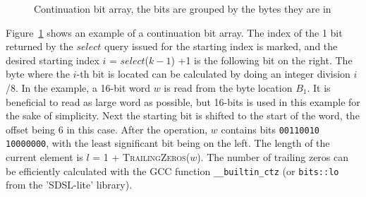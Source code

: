 \begin{figure}[ht]
\centering
{}
\caption{Continuation bit array, the bits are grouped by the bytes they are in} \label{subarray}
\end{figure}

Figure~\ref{subarray} shows an example of a continuation bit array. The index of the 1 bit returned by the $select$ query issued for the starting index is marked, and the desired starting index 
$i$ = $select$($k-1$) +1 is the following bit on the right. The byte where the $i$-th bit is located can be calculated by doing an integer division $i$/8. In the example, a 16-bit word $w$ is read from the byte location $B_1$.
It is beneficial to read as large word as possible, but 16-bits is used in this example for the sake of simplicity. Next the starting bit is shifted to the start of the word, the offset being 6 in this case. 
After the operation, $w$ contains bits \texttt{00110010 10000000}, with the least significant bit being on the left. The length of the current element is $l$ = 1 + \textsc{TrailingZeros}($w$). The number of 
trailing zeros can be efficiently calculated with the GCC function \texttt{\_\_builtin\_ctz} (or \texttt{bits::lo} from the 'SDSL-lite' library).

